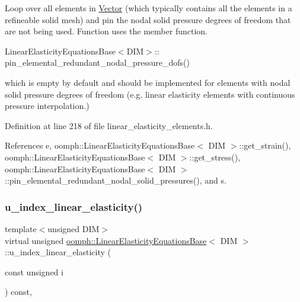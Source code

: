 Loop over all elements in \hyperlink{classoomph_1_1Vector}{Vector} (which typically contains all the elements in a refineable solid mesh) and pin the nodal solid pressure degrees of freedom that are not being used. Function uses the member function. 


\begin{DoxyItemize}
\item {\ttfamily Linear\+Elasticity\+Equations\+Base$<$\+D\+I\+M$>$}\+:\+: pin\+\_\+elemental\+\_\+redundant\+\_\+nodal\+\_\+pressure\+\_\+dofs()
\end{DoxyItemize}which is empty by default and should be implemented for elements with nodal solid pressure degrees of freedom (e.\+g. linear elasticity elements with continuous pressure interpolation.) 

Definition at line 218 of file linear\+\_\+elasticity\+\_\+elements.\+h.



References e, oomph\+::\+Linear\+Elasticity\+Equations\+Base$<$ D\+I\+M $>$\+::get\+\_\+strain(), oomph\+::\+Linear\+Elasticity\+Equations\+Base$<$ D\+I\+M $>$\+::get\+\_\+stress(), oomph\+::\+Linear\+Elasticity\+Equations\+Base$<$ D\+I\+M $>$\+::pin\+\_\+elemental\+\_\+redundant\+\_\+nodal\+\_\+solid\+\_\+pressures(), and s.

\mbox{\label{classoomph_1_1LinearElasticityEquationsBase_aec3153c5808fd1259062b2983013e7f4}} 
\subsubsection{\texorpdfstring{u\+\_\+index\+\_\+linear\+\_\+elasticity()}{u\_index\_linear\_elasticity()}}
{\footnotesize\ttfamily template$<$unsigned D\+IM$>$ \\
virtual unsigned \hyperlink{classoomph_1_1LinearElasticityEquationsBase}{oomph\+::\+Linear\+Elasticity\+Equations\+Base}$<$ D\+IM $>$\+::u\+\_\+index\+\_\+linear\+\_\+elasticity (\begin{DoxyParamCaption}\item[{const unsigned}]{i }\end{DoxyParamCaption}) const\hspace{0.3cm}{\ttfamily [inline]}, {\ttfamily [virtual]}}



